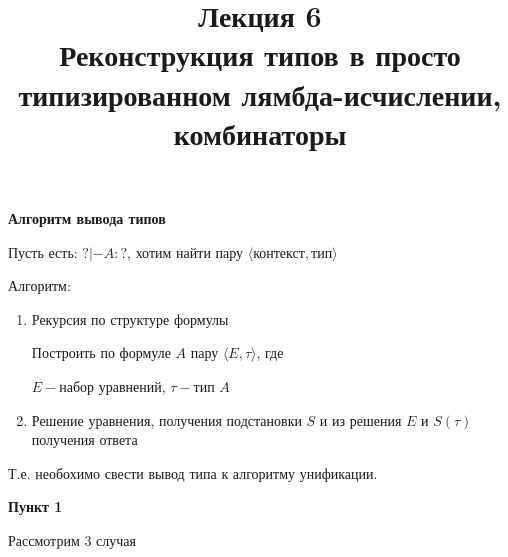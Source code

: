 \documentclass[12pt, a4paper]{article}
\begin{document}
	\begin{titlepage}
		\title{Лекция 6 \\ Реконструкция типов в просто типизированном лямбда-исчислении, комбинаторы}
		\date{}
	\end{titlepage}
		\maketitle
		\par \textbf{Алгоритм вывода типов}\par
			Пусть есть: $?|-A:?$, хотим найти пару $\big \langle \text{контекст}, \text{тип} \big \rangle$\par
	Алгоритм:
	\begin{enumerate}
		\item Рекурсия по структуре формулы\par Построить по формуле $A$ пару $\big \langle E, \tau\big \rangle$, где\par $E-$набор уравнений, $\tau-$тип $A$
		\item Решение уравнения, получения подстановки $S$ и из решения $E$ и $S(\tau)$ получения ответа	
	\end{enumerate}
		Т.е. необохимо свести вывод типа к алгоритму унификации.\par
		\textbf{Пункт 1}\par Рассмотрим 3 случая
						
\end{document}
